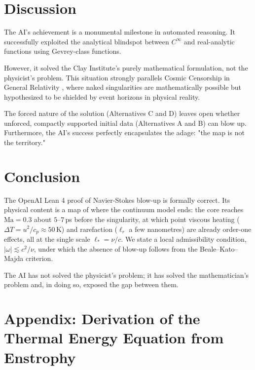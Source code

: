 \documentclass[11pt,a4paper]{article}
\theoremstyle{definition}
\begin{document}
\section{Discussion}

The AI's achievement is a monumental milestone in automated reasoning. It successfully exploited the analytical blindspot between $C^\infty$ and real-analytic functions using Gevrey-class functions.

However, it solved the Clay Institute's purely mathematical formulation, not the physicist's problem. This situation strongly parallels Cosmic Censorship in General Relativity \cite{Penrose1969}, where naked singularities are mathematically possible but hypothesized to be shielded by event horizons in physical reality.

The forced nature of the solution (Alternatives C and D) leaves open whether unforced, compactly supported initial data (Alternatives A and B) can blow up. Furthermore, the AI's success perfectly encapsulates the adage: "the map is not the territory."

\section{Conclusion}

The OpenAI Lean 4 proof of Navier-Stokes blow-up is formally correct. Its physical content is a map of where the continuum model ends: the core reaches $\mathrm{Ma}=0.3$ about $5$--$7$\,ps before the singularity, at which point viscous heating ($\Delta T=u^2/c_p\approx50$\,K) and rarefaction ($\ell_r$ a few nanometres) are already order-one effects, all at the single scale $\ell_*=\nu/c$. We state a local admissibility condition, $|\omega|\lesssim c^2/\nu$, under which the absence of blow-up follows from the Beale--Kato--Majda criterion.

The AI has not solved the physicist's problem; it has solved the mathematician's problem and, in doing so, exposed the gap between them.

\appendix
\section{Appendix: Derivation of the Thermal Energy Equation from Enstrophy}
\end{document}
